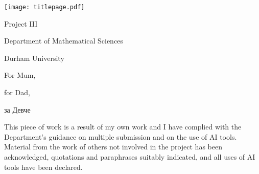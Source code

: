 \begin{titlepage}
	\begin{center}
		\vspace{1cm}

		\LARGE{}

		\vspace{1.0cm}


		\vspace{0.5cm}

		\normalsize{}

		\vfill

		\texttt{[image: titlepage.pdf]}

		\vfill

		Project III

		\vspace{0.5cm}

		Department of Mathematical Sciences

		\vspace{0.5cm}

		Durham University

	\end{center}

\end{titlepage}

\clearpage
\begin{center}
	\vspace*{\fill}
	For Mum,

	for Dad,

	{\accentfont за Девче}
	\vspace*{\fill}
\end{center}
\clearpage

\vspace*{\fill}
This piece of work is a result of my own work and I have complied with the
Department's guidance on multiple submission and on the use of AI tools.
Material from the work of others not involved in the project has been
acknowledged, quotations and paraphrases suitably indicated, and all uses of AI
tools have been declared.
\vspace*{\fill}
\clearpage

